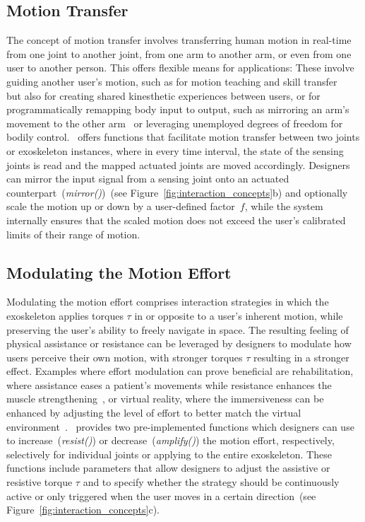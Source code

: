 \subsection{Motion Transfer}

The concept of motion transfer involves transferring human motion in real-time from one joint to another joint, from one arm to another arm, or even from one user to another person. This offers flexible means for applications: These involve guiding another user's motion, such as for motion teaching and skill transfer ~\cite{nishida_2022,maekawa_2019} but also for creating shared kinesthetic experiences between users, or for programmatically remapping body input to output, such as mirroring an arm's movement to the other arm~\cite{pignolo_2012} or leveraging unemployed degrees of freedom for bodily control. 
\toolkit~offers functions that facilitate motion transfer between two joints or exoskeleton instances, where in every time interval, the state of the sensing joints is read and the mapped actuated joints are moved accordingly. 
Designers can mirror the input signal from a sensing joint onto an actuated counterpart~(\textit{mirror()})~(see Figure~\ref{fig:interaction_concepts}b) and optionally scale the motion up or down by a user-defined factor~$f$, while the system internally ensures that the scaled motion does not exceed the user's calibrated limits of their range of motion. 

\subsection{Modulating the Motion Effort}
Modulating the motion effort comprises interaction strategies in which the exoskeleton applies torques $\tau$ in or opposite to a user's inherent motion, while preserving the user's ability to freely navigate in space. 
The resulting feeling of physical assistance or resistance can be leveraged by designers to modulate how users perceive their own motion, with stronger torques $\tau$ resulting in a stronger effect. 
Examples where effort modulation can prove beneficial are rehabilitation, where assistance eases a patient's movements while resistance enhances the muscle strengthening~\cite{gasperina_2021,proietti_2016}, or virtual reality, where the immersiveness can be enhanced by adjusting the level of effort to better match the virtual environment~\cite{teng_2022}.
\toolkit~provides two pre-implemented functions which designers can use to increase~(\textit{resist()}) or decrease~(\textit{amplify()}) the motion effort, respectively, selectively for individual joints or applying to the entire exoskeleton. These functions include parameters that allow designers to adjust the assistive or resistive torque $\tau$ and to specify whether the strategy should be continuously active or only triggered when the user moves in a certain direction~(see Figure~\ref{fig:interaction_concepts}c).

